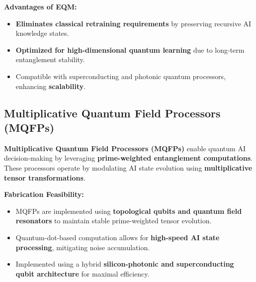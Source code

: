 \documentclass{article}
\theoremstyle{plain}
\begin{document}
\noindent \textbf{Advantages of EQM:}
\begin{itemize}
    \item \textbf{Eliminates classical retraining requirements} by preserving recursive AI knowledge states.
    \item \textbf{Optimized for high-dimensional quantum learning} due to long-term entanglement stability.
    \item Compatible with superconducting and photonic quantum processors, enhancing \textbf{scalability}.
\end{itemize}

\subsection{Multiplicative Quantum Field Processors (MQFPs)}

\textbf{Multiplicative Quantum Field Processors (MQFPs)} enable quantum AI decision-making by leveraging \textbf{prime-weighted entanglement computations}. These processors operate by modulating AI state evolution using \textbf{multiplicative tensor transformations}.

\noindent \textbf{Fabrication Feasibility:}
\begin{itemize}
    \item MQFPs are implemented using \textbf{topological qubits and quantum field resonators} to maintain stable prime-weighted tensor evolution.
    \item Quantum-dot-based computation allows for \textbf{high-speed AI state processing}, mitigating noise accumulation.
    \item Implemented using a hybrid \textbf{silicon-photonic and superconducting qubit architecture} for maximal efficiency.
\end{itemize}
\end{document}

